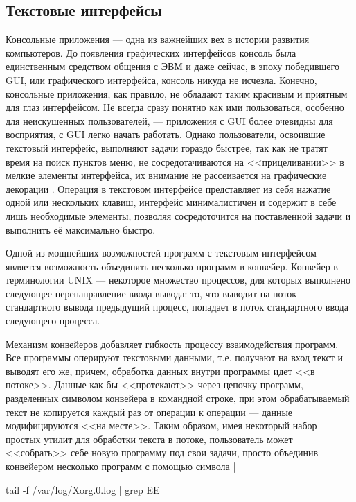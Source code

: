 \subsection{Текстовые интерфейсы}

Консольные приложения --- одна из важнейших вех в истории развития
компьютеров. До появления графических интерфейсов консоль была
единственным средством общения с ЭВМ и даже сейчас, в эпоху
победившего GUI, или графического интерфейса, консоль никуда не исчезла. Конечно, консольные
приложения, как правило, не обладают таким красивым и приятным для
глаз интерфейсом.  Не всегда сразу понятно как ими пользоваться,
особенно для неискушенных пользователей, --- приложения с GUI более
очевидны для восприятия, с GUI легко начать работать. Однако
пользователи, освоившие текстовый интерфейс, выполняют задачи гораздо
быстрее, так как не тратят время на поиск пунктов меню, не
сосредотачиваются на <<прицеливании>> в мелкие элементы интерфейса, их
внимание не рассеивается на графические декорации
\cite{infoworld:gui-tui}. Операция в текстовом интерфейсе представляет
из себя нажатие одной или нескольких клавиш, интерфейс минималистичен
и содержит в себе лишь необходимые элементы, позволяя сосредоточится
на поставленной задачи и выполнить её максимально быстро.

Одной из мощнейших возможностей программ с текстовым интерфейсом
является возможность объединять несколько программ в
конвейер. Конвейер \cite{wiki:pipe}
в терминологии UNIX --- некоторое множество процессов, для которых
выполнено следующее перенаправление ввода-вывода: то, что выводит на
поток стандартного вывода предыдущий процесс, попадает в поток
стандартного ввода следующего процесса.

Механизм конвейеров добавляет гибкость процессу взаимодействия
программ.  Все программы оперируют текстовыми данными, т.е. получают
на вход текст и выводят его же, причем, обработка данных внутри
программы идет <<в потоке>>. Данные как-бы <<протекают>> через цепочку
программ, разделенных символом конвейера в командной строке, при этом
обрабатываемый текст не копируется каждый раз от операции к операции
--- данные модифицируются <<на месте>>. Таким образом, имея некоторый набор
простых утилит для обработки текста в потоке, пользователь может
<<собрать>> себе новую программу под свои задачи, просто объединив
конвейером несколько программ с помощью символа |

\begin{bashcode}
  tail -f /var/log/Xorg.0.log | grep EE
\end{bashcode}

